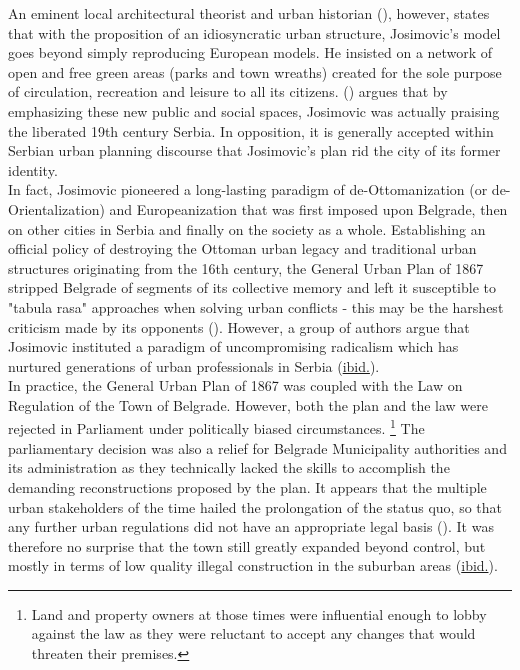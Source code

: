 \documentclass[11pt]{report}
\begin{document}
An eminent local architectural theorist and urban historian (\href{Blagojevic}{\citealt{blagojevic_urban_2009}}), however, states that with the proposition of an idiosyncratic urban structure, Josimovic's model goes beyond simply reproducing European models.
He insisted on a network of open and free green areas (parks and town wreaths) created for the sole purpose of circulation, recreation and leisure to all its citizens. (\href{Blagojevic}{\citealt{blagojevic_urban_2009}}) argues that by emphasizing these new public and social spaces, Josimovic was actually praising the liberated 19th century Serbia. In opposition, it is generally accepted within Serbian urban planning discourse that Josimovic’s plan rid the city of its former identity.
\\

In fact,  Josimovic pioneered a long-lasting paradigm of de-Ottomanization (or de-Orientalization) and Europeanization that was first imposed upon Belgrade, then on other cities in Serbia and finally on the society as a whole. Establishing an official policy of destroying the Ottoman urban legacy and traditional urban structures originating from the 16th century, the General Urban Plan of 1867 stripped Belgrade of segments of its collective memory and left it susceptible to "tabula rasa" approaches when solving urban conflicts - this may be the harshest criticism made by its opponents  (\href{Doytchinov}{\citealt{doytchinov_modernization_2015}}).
However, a group of authors argue that Josimovic instituted a paradigm of uncompromising radicalism which has nurtured generations of urban professionals in Serbia (\href{ref}{ibid.}).
\\

In  practice,  the General  Urban  Plan  of  1867  was  coupled  with  the  Law  on  Regulation  of the  Town  of  Belgrade.    However,  both  the  plan  and  the  law  were  rejected  in  Parliament under politically biased circumstances.
\footnote{Land and property owners at those times were influential enough to lobby against the law as they were reluctant to accept any changes that would threaten their premises.}
The parliamentary decision was also a relief for Belgrade Municipality authorities and its administration as they technically lacked the skills to accomplish the demanding reconstructions proposed by the plan. It appears that the multiple urban stakeholders of the time hailed the prolongation of the status quo, so that any further urban regulations did not have an appropriate legal basis (\href{Doytchinov}{\citealt{doytchinov_modernization_2015}}). It was therefore no surprise that the town still greatly expanded beyond control, but mostly in terms of low quality illegal construction in the suburban areas (\href{ref}{ibid.}).
\\
\end{document}
